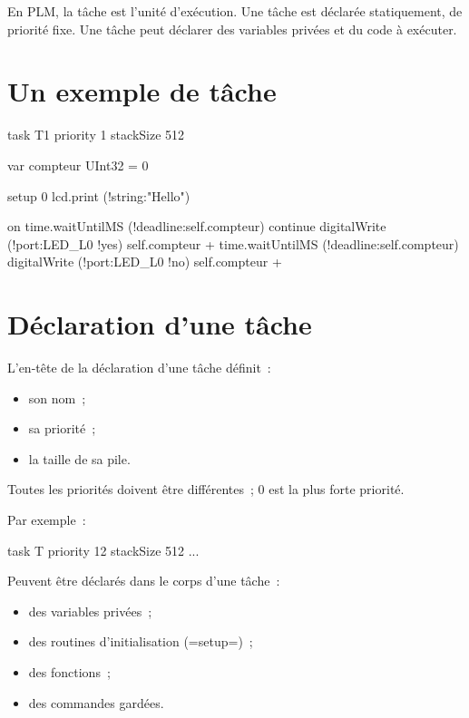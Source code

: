 





En PLM, la tâche est l'unité d'exécution. Une tâche est déclarée statiquement, de priorité fixe. Une tâche peut déclarer des variables privées et du code à exécuter.


\section{Un exemple de tâche}


\begin{PLM}
task T1 priority 1 stackSize 512 {
  var compteur UInt32 = 0

  setup 0 {
    lcd.print (!string:"Hello")
  }
  
  on time.waitUntilMS (!deadline:self.compteur) continue {
    digitalWrite (!port:LED_L0 !yes)
    self.compteur +%
    time.waitUntilMS (!deadline:self.compteur)
    digitalWrite (!port:LED_L0 !no)
    self.compteur +%
  }
}
\end{PLM}

\section{Déclaration d'une tâche}

L'en-tête de la déclaration d'une tâche définit~:
\begin{itemize}
  \item son nom~;
  \item sa priorité~;
  \item la taille de sa pile.
\end{itemize}

Toutes les priorités doivent être différentes~; $0$ est la plus forte priorité.

Par exemple~:
\begin{PLM}
task T priority 12 stackSize 512 {
  ...
}
\end{PLM}

Peuvent être déclarés dans le corps d'une tâche~:
\begin{itemize}
  \item des variables privées~;
  \item des routines d'initialisation (\plm=setup=)~;
  \item des fonctions~;
  \item des commandes gardées.
\end{itemize}

